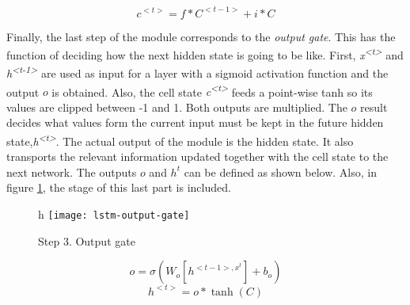 	
	\[c^{<t>} = f * C^{<t-1>} + i * C\]
	
				
	Finally, the last step of the module corresponds to the \textit{output gate}. This has the function of deciding how the next hidden state is going to be like. First, \textit{x\textsuperscript{<t>}} and \textit{h\textsuperscript{<t-1>}} are used as input for a layer with a sigmoid activation function and the output $o$ is obtained. Also, the cell state \textit{c\textsuperscript{<t>}} feeds a point-wise \acrshort{tanh} so its values are clipped between -1 and 1. Both outputs are multiplied. The $o$ result decides what values form the current input must be kept in the future hidden state,\textit{h\textsuperscript{<t>}}. The actual output of the module is the hidden state. It also transports the relevant information updated together with the cell state to the next network. The outputs $o$ and $h^{t}$ can be defined as shown below. Also, in figure \ref{fig:mesh45}, the stage of this last part is included.
		
	\begin{figure}{h}
		\centering
		\captionsetup{justification=centering}
		\texttt{[image: lstm-output-gate]}
		\caption{Step 3. Output gate}
		\label{fig:mesh45}
	\end{figure}
	
	\[ o = \sigma(W_{o}[h^{<t-1>, x^{t}}] + b_{o}) \]
	\[ h^{<t>} = o * \tanh(C) \]

	\lipsum[1]
	
	
	
	